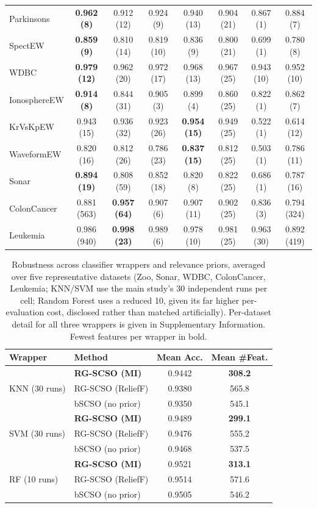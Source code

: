 \documentclass[iicol,sn-basic,pdflatex]{sn-jnl}
\begin{document}
\begin{table}
\begin{tabular}{lccccccc}
Parkinsons & \textbf{0.962 (8)} & 0.912 (12) & 0.924 (9) & 0.940 (13) & 0.904 (21) & 0.867 (1) & 0.884 (7) \\
SpectEW & \textbf{0.859 (9)} & 0.810 (14) & 0.819 (10) & 0.836 (9) & 0.800 (21) & 0.699 (1) & 0.780 (8) \\
WDBC & \textbf{0.979 (12)} & 0.962 (20) & 0.972 (17) & 0.968 (13) & 0.967 (25) & 0.943 (10) & 0.952 (10) \\
IonosphereEW & \textbf{0.914 (8)} & 0.844 (31) & 0.905 (3) & 0.899 (4) & 0.860 (25) & 0.822 (1) & 0.862 (7) \\
KrVsKpEW & 0.943 (15) & 0.936 (32) & 0.923 (26) & \textbf{0.954 (15)} & 0.949 (25) & 0.522 (1) & 0.614 (12) \\
WaveformEW & 0.820 (16) & 0.812 (26) & 0.786 (23) & \textbf{0.837 (15)} & 0.812 (25) & 0.503 (1) & 0.786 (11) \\
Sonar & \textbf{0.894 (19)} & 0.808 (59) & 0.852 (18) & 0.820 (8) & 0.822 (25) & 0.686 (1) & 0.787 (16) \\
ColonCancer & 0.881 (563) & \textbf{0.957 (64)} & 0.907 (6) & 0.907 (11) & 0.902 (25) & 0.836 (3) & 0.794 (324) \\
Leukemia & 0.986 (940) & \textbf{0.998 (23)} & 0.989 (6) & 0.978 (10) & 0.981 (25) & 0.963 (30) & 0.892 (419) \\
\bottomrule
\end{tabular}
\end{table}


\begin{table}[tb]
\centering
\caption{Robustness across classifier wrappers and relevance priors, averaged over five representative datasets (Zoo, Sonar, WDBC, ColonCancer, Leukemia; KNN/SVM use the main study's 30 independent runs per cell; Random Forest uses a reduced 10, given its far higher per-evaluation cost, disclosed rather than matched artificially). Per-dataset detail for all three wrappers is given in Supplementary Information. Fewest features per wrapper in bold.}
\label{tab:classifierrobust}
\footnotesize
\begin{tabular}{llcc}
\toprule
Wrapper & Method & Mean Acc. & Mean \#Feat. \\
\midrule
\multirow{3}{*}{KNN (30 runs)} & \textbf{RG-SCSO (MI)} & 0.9442 & \textbf{308.2} \\
 & RG-SCSO (ReliefF) & 0.9380 & 565.8 \\
 & bSCSO (no prior) & 0.9350 & 545.1 \\
\midrule
\multirow{3}{*}{SVM (30 runs)} & \textbf{RG-SCSO (MI)} & 0.9489 & \textbf{299.1} \\
 & RG-SCSO (ReliefF) & 0.9476 & 555.2 \\
 & bSCSO (no prior) & 0.9468 & 537.5 \\
\midrule
\multirow{3}{*}{RF (10 runs)} & \textbf{RG-SCSO (MI)} & 0.9521 & \textbf{313.1} \\
 & RG-SCSO (ReliefF) & 0.9514 & 571.6 \\
 & bSCSO (no prior) & 0.9505 & 546.2 \\
\bottomrule
\end{tabular}
\end{table}
\end{document}
